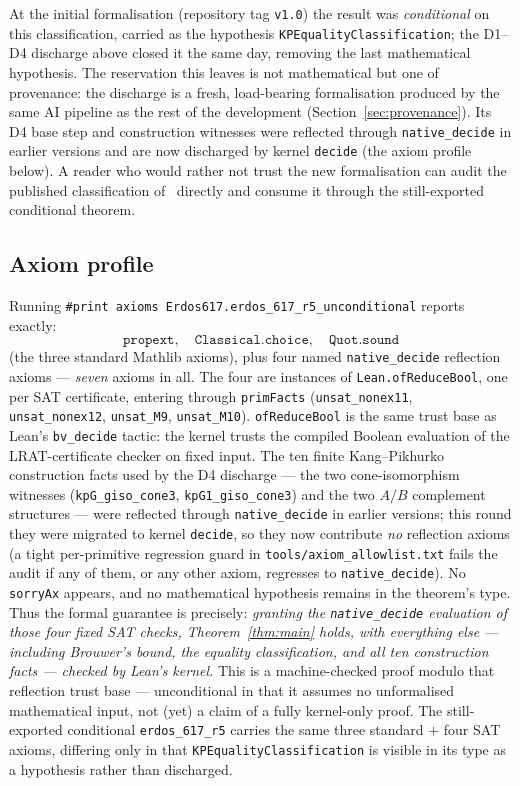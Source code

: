 \documentclass[11pt,reqno]{amsart}
\theoremstyle{definition}
\theoremstyle{remark}
\begin{document}
At the initial formalisation (repository tag \texttt{v1.0}) the result was
\emph{conditional} on this classification, carried as the hypothesis
\texttt{KPEqualityClassification}; the D1--D4 discharge above closed it the same day,
removing the last mathematical hypothesis. The reservation this leaves is not
mathematical but one of provenance: the discharge is a fresh, load-bearing
formalisation produced by the same AI pipeline as the rest of the development
(Section~\ref{sec:provenance}). Its D4 base step and construction witnesses were reflected
through \texttt{native\_decide} in earlier versions and are now discharged by kernel
\texttt{decide} (the axiom profile below). A reader who would rather not trust
the new formalisation can audit the published classification of~\cite{KP05} directly and
consume it through the still-exported conditional theorem.

\subsection{Axiom profile}
Running \texttt{\#print axioms Erdos617.erdos\_617\_r5\_unconditional} reports exactly:
\[
  \texttt{propext},\quad \texttt{Classical.choice},\quad \texttt{Quot.sound}
\]
(the three standard Mathlib axioms), plus four named \texttt{native\_decide}
reflection axioms --- \emph{seven} axioms in all. The four are instances of
\texttt{Lean.ofReduceBool}, one per SAT certificate, entering through \texttt{primFacts}
(\texttt{unsat\_nonex11}, \texttt{unsat\_nonex12}, \texttt{unsat\_M9}, \texttt{unsat\_M10}).
\texttt{ofReduceBool} is the same trust base as Lean's \texttt{bv\_decide} tactic: the
kernel trusts the compiled Boolean evaluation of the LRAT-certificate checker on fixed
input. The ten finite Kang--Pikhurko construction facts used by the D4 discharge --- the
two cone-isomorphism witnesses (\texttt{kpG\_giso\_cone3}, \texttt{kpG1\_giso\_cone3}) and
the two $A/B$ complement structures --- were reflected through \texttt{native\_decide} in
earlier versions; this round they were migrated to kernel \texttt{decide}, so they now
contribute \emph{no} reflection axioms (a tight per-primitive regression guard in
\texttt{tools/axiom\_allowlist.txt} fails the audit if any of them, or any other axiom,
regresses to \texttt{native\_decide}). No \texttt{sorryAx} appears, and no mathematical
hypothesis remains in the theorem's type. Thus the formal guarantee is precisely:
\emph{granting the \texttt{native\_decide} evaluation of those four fixed SAT checks,
Theorem~\ref{thm:main} holds, with everything else --- including Brouwer's bound, the
equality classification, and all ten construction facts --- checked by Lean's kernel.}
This is a machine-checked proof modulo that reflection trust base --- unconditional in that
it assumes no unformalised mathematical input, not (yet) a claim of a fully kernel-only
proof. The still-exported conditional \texttt{erdos\_617\_r5} carries the same three
standard $+$ four SAT axioms, differing only in that \texttt{KPEqualityClassification} is
visible in its type as a hypothesis rather than discharged.
\end{document}
